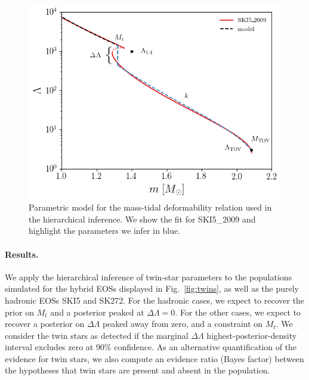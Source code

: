 \documentclass[aps,prl,twocolumn,superscriptaddress,footinbib]{revtex4-1}
\begin{document}
\begin{figure}[b]
    \centering
    \includegraphics[width=0.9\columnwidth,trim={5 5 5 5},clip]{SKI52009_fit.png}
    \caption{Parametric model for the mass-tidal deformability relation used in the hierarchical inference. We show the fit for SKI5\_2009 and highlight the parameters we infer in blue.}
    \label{fig:diagram}
\end{figure}

\paragraph{Results.}\label{Sec_res}

We apply the hierarchical inference of twin-star parameters to the populations simulated for the hybrid EOSs displayed in Fig.~\ref{fig:twins}, as well as the purely hadronic EOSs SKI5 and SK272. For the hadronic cases, we expect to recover the prior on $M_{t}$ and a posterior peaked at $\Delta\Lambda = 0$. For the other cases, we expect to recover a posterior on $\Delta\Lambda$ peaked away from zero, and a constraint on $M_{t}$. We consider the twin stars as detected if the marginal $\Delta\Lambda$ highest-posterior-density interval excludes zero at 90\% confidence. As an alternative quantification of the evidence for twin stars, we also compute an evidence ratio (Bayes factor) between the hypotheses that twin stars are present and absent in the population.
\end{document}
